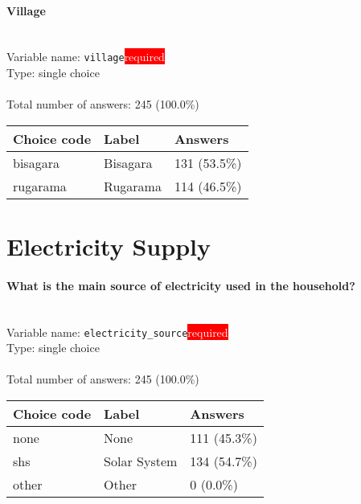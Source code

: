 \documentclass[11.5pt, a4paper]{scrartcl}
\begin{document}
\paragraph{Village}
\  \\Variable name: \texttt{village}\hfill\colorbox{red}{\small{\textcolor{white}{required}}}\\
 Type: single choice\\
\\Total number of answers: 245 (100.0\%)
\\[0.2em] \begin{tabular}{p{4cm}|p{8cm}|p{3cm}}
Choice code & Label & Answers \\
\hline
bisagara & Bisagara& \cellcolor{color2}131 (53.5\%)\\
\cellcolor{mygray} rugarama & \cellcolor{mygray}Rugarama & \cellcolor{color2}114 (46.5\%)\\
\end{tabular}
\newpage\section{Electricity Supply}
\paragraph{What is the main source of electricity used in the household?}
\  \\Variable name: \texttt{electricity\_source}\hfill\colorbox{red}{\small{\textcolor{white}{required}}}\\
 Type: single choice\\
\\Total number of answers: 245 (100.0\%)
\\[0.2em] \begin{tabular}{p{4cm}|p{8cm}|p{3cm}}
Choice code & Label & Answers \\
\hline
none & None& \cellcolor{color2}111 (45.3\%)\\
\cellcolor{mygray} shs & \cellcolor{mygray}Solar System & \cellcolor{color2}134 (54.7\%)\\
other & Other& \cellcolor{color0}0 (0.0\%)\\
\end{tabular}
\end{document}
